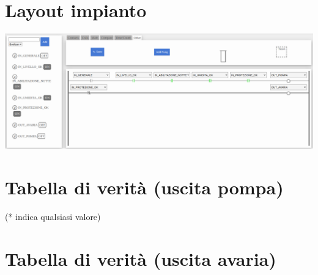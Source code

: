 \documentclass{article}
\begin{document}
    \section{Layout impianto}

    \begin{center}
        \includegraphics[width=\textwidth]{esercizio_irrigazione.png}
    \end{center}

    \section{Tabella di verità (uscita pompa)}

    \begin{table}[H]
    \centering
    \end{table}

    (* indica qualsiasi valore)

    \section{Tabella di verità (uscita avaria)}
\end{document}
